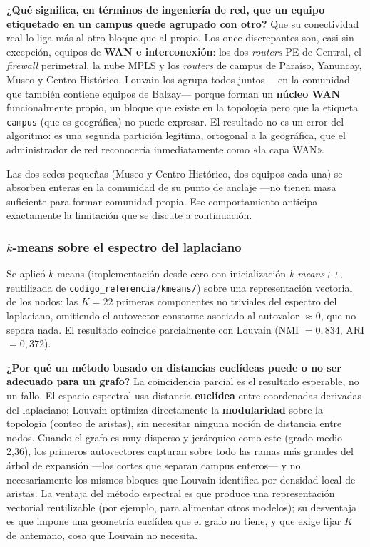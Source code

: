 \documentclass[10pt,a4paper]{extarticle}
\newcommand{\code}[1]{\texttt{\small #1}}
\begin{document}
\textbf{¿Qué significa, en términos de ingeniería de red, que un equipo etiquetado en un
campus quede agrupado con otro?} Que su conectividad real lo liga más al otro bloque que al
propio. Los once discrepantes son, casi sin excepción, equipos de \textbf{WAN e
interconexión}: los dos \textit{routers} PE de Central, el \textit{firewall} perimetral, la
nube MPLS y los \textit{routers} de campus de Paraíso, Yanuncay, Museo y Centro Histórico.
Louvain los agrupa todos juntos ---en la comunidad que también contiene equipos de Balzay---
porque forman un \textbf{núcleo WAN} funcionalmente propio, un bloque que existe en la
topología pero que la etiqueta \code{campus} (que es geográfica) no puede expresar. El
resultado no es un error del algoritmo: es una segunda partición legítima, ortogonal a la
geográfica, que el administrador de red reconocería inmediatamente como «la capa WAN».

Las dos sedes pequeñas (Museo y Centro Histórico, dos equipos cada una) se absorben enteras
en la comunidad de su punto de anclaje ---no tienen masa suficiente para formar comunidad
propia. Ese comportamiento anticipa exactamente la limitación que se discute a continuación.

\subsubsection{$k$-means sobre el espectro del laplaciano}

Se aplicó $k$-means (implementación desde cero con inicialización \textit{k-means++},
reutilizada de \code{codigo\_referencia/kmeans/}) sobre una representación vectorial de los
nodos: las $K=22$ primeras componentes no triviales del espectro del laplaciano, omitiendo
el autovector constante asociado al autovalor $\approx 0$, que no separa nada. El resultado
coincide parcialmente con Louvain (NMI $=0{,}834$, ARI $=0{,}372$).

\textbf{¿Por qué un método basado en distancias euclídeas puede o no ser adecuado para un
grafo?} La coincidencia parcial es el resultado esperable, no un fallo. El espacio espectral
usa distancia \textbf{euclídea} entre coordenadas derivadas del laplaciano; Louvain optimiza
directamente la \textbf{modularidad} sobre la topología (conteo de aristas), sin necesitar
ninguna noción de distancia entre nodos. Cuando el grafo es muy disperso y jerárquico como
este (grado medio 2,36), los primeros autovectores capturan sobre todo las ramas más grandes
del árbol de expansión ---los cortes que separan campus enteros--- y no necesariamente los
mismos bloques que Louvain identifica por densidad local de aristas. La ventaja del método
espectral es que produce una representación vectorial reutilizable (por ejemplo, para
alimentar otros modelos); su desventaja es que impone una geometría euclídea que el grafo no
tiene, y que exige fijar $K$ de antemano, cosa que Louvain no necesita.
\end{document}
